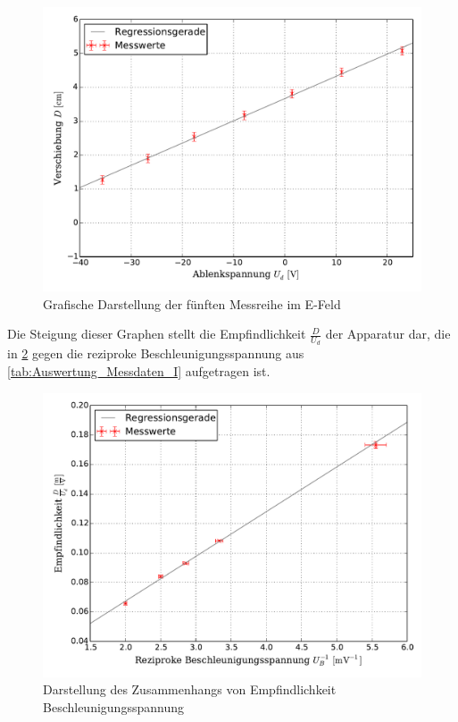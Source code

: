 		\begin{figure}[!h]
		\centering
				\includegraphics[scale=0.7]{Grafiken/EFeld_Messreihe_V.pdf}
				\caption{Grafische Darstellung der fünften Messreihe im E-Feld}\label{fig:Auswertung_Messdaten_I_V}
		\end{figure}
		
		Die Steigung dieser Graphen stellt die Empfindlichkeit $\frac{D}{U_{d}}$
		der Apparatur dar, die in \cref{fig:Auswertung_Messdaten_I_VI} gegen die reziproke 
		Beschleunigungsspannung aus \cref{tab:Auswertung_Messdaten_I} aufgetragen ist.
		
		\begin{figure}[!h]
		\centering
			\includegraphics[scale=0.7]{Grafiken/EFeld_Messreihe_VI.pdf}
			\caption{Darstellung des Zusammenhangs von Empfindlichkeit Beschleunigungsspannung}\label{fig:Auswertung_Messdaten_I_VI}
		\end{figure}
		
